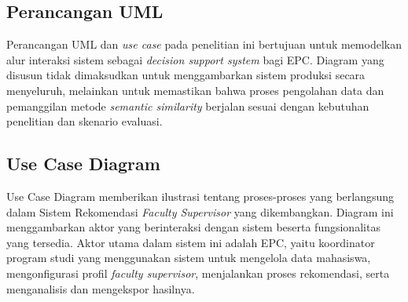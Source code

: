 \subsection{Perancangan UML}\label{perancangan-uml}

Perancangan UML dan \textit{use case} pada penelitian ini bertujuan untuk memodelkan alur interaksi sistem sebagai \textit{decision support system} bagi EPC. Diagram yang disusun tidak dimaksudkan untuk menggambarkan sistem produksi secara menyeluruh, melainkan untuk memastikan bahwa proses pengolahan data dan pemanggilan metode \textit{semantic similarity} berjalan sesuai dengan kebutuhan penelitian dan skenario evaluasi.

\subsection{Use Case Diagram}\label{use-case-diagram}

Use Case Diagram memberikan ilustrasi tentang proses-proses yang berlangsung dalam Sistem Rekomendasi \textit{Faculty Supervisor} yang dikembangkan. Diagram ini menggambarkan aktor yang berinteraksi dengan sistem beserta fungsionalitas yang tersedia. Aktor utama dalam sistem ini adalah EPC, yaitu koordinator program studi yang menggunakan sistem untuk mengelola data mahasiswa, mengonfigurasi profil \textit{faculty supervisor}, menjalankan proses rekomendasi, serta menganalisis dan mengekspor hasilnya.

